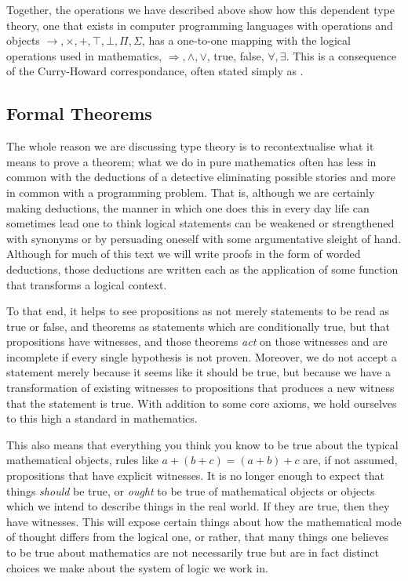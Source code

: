 \documentclass[11pt]{article}
\begin{document}
Together, the operations we have described above show how this dependent type theory, one that exists in computer programming languages with operations and objects $\to, \times, +, \top, \bot, \Pi, \Sigma$, has a one-to-one mapping with the logical operations used in mathematics, $\Rightarrow, \wedge, \vee$, true, false, $\forall, \exists$. This is a consequence of the Curry-Howard correspondance, often stated simply as .

\subsection{Formal Theorems}

The whole reason we are discussing type theory is to recontextualise what it means to prove a theorem; what we do in pure mathematics often has less in common with the deductions of a detective eliminating possible stories and more in common with a programming problem. That is, although we are certainly making deductions, the manner in which one does this in every day life can sometimes lead one to think logical statements can be weakened or strengthened with synonyms or by persuading oneself with some argumentative sleight of hand. Although for much of this text we will write proofs in the form of worded deductions, those deductions are written each as the application of some function that transforms a logical context.

To that end, it helps to see propositions as not merely statements to be read as true or false, and theorems as statements which are conditionally true, but that propositions have witnesses, and those theorems \emph{act} on those witnesses and are incomplete if every single hypothesis is not proven. Moreover, we do not accept a statement merely because it seems like it should be true, but because we have a transformation of existing witnesses to propositions that produces a new witness that the statement is true. With addition to some core axioms, we hold ourselves to this high a standard in mathematics.

This also means that everything you think you know to be true about the typical mathematical objects, rules like $a + (b + c) = (a + b) + c$ are, if not assumed, propositions that have explicit witnesses. It is no longer enough to expect that things \emph{should} be true, or \emph{ought} to be true of mathematical objects or objects which we intend to describe things in the real world. If they are true, then they have witnesses. This will expose certain things about how the mathematical mode of thought differs from the logical one, or rather, that many things one believes to be true about mathematics are not necessarily true but are in fact distinct choices we make about the system of logic we work in.
\end{document}
